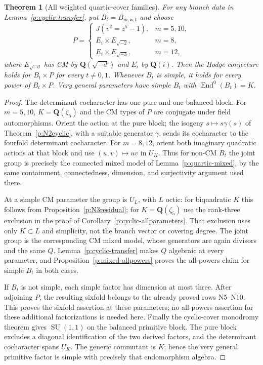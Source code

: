 \documentclass[11pt,reqno]{article}
\theoremstyle{emphasizedplain}
\newtheorem{theorem}{Theorem}[section]
\theoremstyle{emphasizeddefinition}
\theoremstyle{emphasizeddefinition}
\DeclareMathOperator{\End}{End}
\DeclareMathOperator{\SU}{SU}
\newcommand{\Q}{\mathbf Q}
\begin{document}
\begin{theorem}[All weighted quartic-cover families]\label{p:weighted-families}
For any branch data in Lemma~\ref{p:cyclic-transfer}, put
$B_t=B_{m,\boldsymbol a,t}$ and choose
\[
 P=\begin{cases}
 J(v^2=z^5-1),&m=5,10,\\
 E_i\times E_{\sqrt{-2}},&m=8,\\
 E_i\times E_{\sqrt{-3}},&m=12,
 \end{cases}
\]
where $E_{\sqrt{-d}}$ has CM by $\Q(\sqrt{-d})$ and $E_i$ by
$\Q(i)$. Then the Hodge conjecture holds for $B_t\times P$ for every
$t\ne0,1$. Whenever $B_t$ is simple, it holds for every power of
$B_t\times P$. Very general parameters have simple $B_t$ with
$\End^0(B_t)=K$.
\end{theorem}
\begin{proof}
The determinant cocharacter has one pure and one balanced block.
For $m=5,10$, $K=\Q(\zeta_5)$ and the CM types of $P$ are conjugate
under field automorphisms. Orient the action at the pure block;
the isogeny $s\mapsto s\gamma(s)$ of Theorem~\ref{p:N2cyclic},
with a suitable generator $\gamma$, sends its cocharacter to the
fourfold determinant cocharacter. For $m=8,12$, orient both imaginary
quadratic actions at that block and use $(u,v)\mapsto uv$ in $U_K$.
Thus for non-CM $B_t$ the joint group is precisely the connected
mixed model of Lemma~\ref{p:quartic-mixed}, by the same containment,
connectedness, dimension, and surjectivity argument used there.

At a simple CM parameter the group is $U_L$, with $L$ octic:
for biquadratic $K$ this follows from
Proposition~\ref{p:N3residual}; for $K=\Q(\zeta_5)$ use the
rank-three exclusion in the proof of
Corollary~\ref{p:cyclic-allparameters}. That exclusion uses only
$K\subset L$ and simplicity, not the branch vector or covering degree.
The joint group is the corresponding CM mixed model, whose generators
are again divisors and the same $Q$. Lemma~\ref{p:cyclic-transfer}
makes $Q$ algebraic at every parameter, and
Proposition~\ref{p:mixed-allpowers} proves the all-powers claim for
simple $B_t$ in both cases.

If $B_t$ is not simple, each simple factor has dimension at most
three. After adjoining $P$, the resulting sixfold belongs to the
already proved rows N5--N10. This proves the sixfold assertion at
these parameters; no all-powers assertion for these additional
factorizations is needed here.
Finally the cyclic-cover monodromy theorem
\cite[Proposition 4.7(i)]{MoonenCyclic} gives $\SU(1,1)$ on the
balanced primitive block. The pure block excludes a diagonal
identification of the two derived factors, and the determinant
cocharacter spans $U_K$. The generic commutant is $K$; hence the
very general primitive factor is simple with precisely that
endomorphism algebra.
\end{proof}
\end{document}
